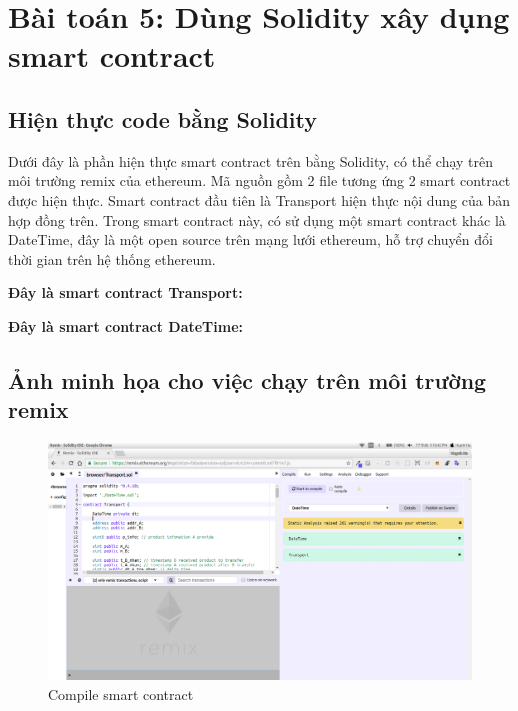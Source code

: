 \section{Bài toán 5: Dùng Solidity xây dụng smart contract}

\subsection{Hiện thực code bằng Solidity}
Dưới đây là phần hiện thực smart contract trên bằng Solidity, có thể chạy trên môi trường remix của ethereum. Mã nguồn gồm 2 file tương ứng 2 smart contract được hiện thực. Smart contract đầu tiên là Transport hiện thực nội dung của bản hợp đồng trên. Trong smart contract này, có sử dụng một smart contract khác là DateTime, đây là một open source trên mạng lưới ethereum, hỗ trợ chuyển đổi thời gian trên hệ thống ethereum.

\vspace{1cm}
\textbf{Đây là smart contract Transport:}




\vspace{1cm}
\textbf{Đây là smart contract DateTime:}




\subsection{Ảnh minh họa cho việc chạy trên môi trường remix}

\begin{figure}[tph]
	\centering
	\includegraphics[width=14cm]{snapshot/1.png}
	\vspace{0.3cm}
	\caption{Compile smart contract}
	\label{fig:fig1}
\end{figure}

